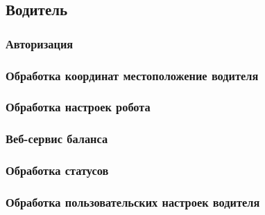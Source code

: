 \subsection{Водитель}

	\subsubsection{Авторизация}

	\subsubsection{Обработка координат местоположение водителя}

	\subsubsection{Обработка настроек робота}

	\subsubsection{Веб-сервис баланса}

	\subsubsection{Обработка статусов}

	\subsubsection{Обработка пользовательских настроек водителя} \label{server_driver_user_settings}